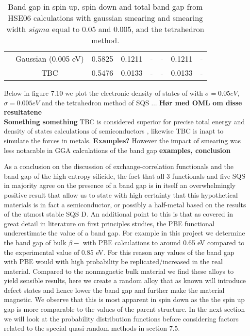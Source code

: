 \begin{landscape}
\begin{table}[H]
\begin{tabular}{@{}cccccccc@{}}
\multicolumn{1}{c|}{}                   & Gaussian (0.005 eV) & 0.5825   & 0.1211   & -        & -        & 0.1211 & -       \\
\multicolumn{1}{c|}{}                   & TBC              & 0.5476   & 0.0133   & -        & -        & 0.0133 & -       \\ \bottomrule
\end{tabular}
\caption{Band gap in spin up, spin down and total band gap from HSE06 calculations with gaussian smearing and smearing width  $sigma$ equal to 0.05 and 0.005, and the tetrahedron method.}
\end{table}
\end{landscape}
\newpage

Below in figure 7.10 we plot the electronic density of states of with $\sigma = 0.05 eV$, $\sigma = 0.005 eV$ and the tetrahedron method of SQS ... \textbf{Hør med OML om disse resultatene} \\

\textbf{Something something} TBC is considered superior for precise total energy and density of states calculations of semiconductors \cite{ismear}, likewise TBC is inapt to simulate the forces in metals. \textbf{Examples?} However the impact of smearing was less notacable in GGA calculations of the band gap \textbf{examples, conclusion}
 
As a conclusion on the discussion of exchange-correlation functionals and the band gap of the  high-entropy silicide, the fact that all 3 functionals and five SQS in majority agree on the presence of a band gap is in itself an overwhelmingly positive result that allow us to state with high certainty that this hypothetical materials is in fact a semiconductor, or possibly a half-metal based on the results of the utmost stable SQS D. An additional point to this is that as covered in great detail in literature on first principles studies, the PBE functional underestimate the value of a band gap. For example in this project we determine the band gap of bulk $\beta-$ with PBE calculations to around 0.65 eV compared to the experimental value of 0.85 eV. For this reason any values of the band gap with PBE would with high probability be replicated/increased in the real material. Compared to the nonmagnetic bulk material we find these alloys to yield sensible results, here we create a random alloy that as known will introduce defect states and hence lower the band gap and further make the material magnetic. We observe that this is most apparent in spin down as the the spin up gap is more comparable to the values of the parent  structure. In the next section we will look at the probability distribution functions before considering factors related to the special quasi-random methods in section 7.5. 


